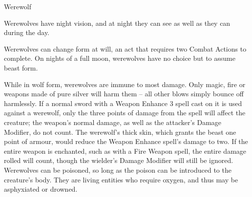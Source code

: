 \begin{monsterbox}{Werewolf}
\begin{rpg-monsteraction}[Magic]
	\end{rpg-monsteraction}
	\begin{rpg-monsteraction}
		Werewolves have night vision, and at night they can see as well as they can during the day.
	\end{rpg-monsteraction}
	\begin{rpg-monsteraction}[Shapeshift]
		Werewolves can change form at will, an act that requires two Combat Actions to complete. On nights of a full moon, werewolves have no choice but to assume beast form.
	\end{rpg-monsteraction}
	\begin{rpg-monsteraction}
		While in wolf form, werewolves are immune to most damage. Only magic, fire or weapons made of pure silver will harm them – all other blows simply bounce off harmlessly. If a normal sword with a Weapon Enhance 3 spell cast on it is used against a werewolf, only the three points of damage from the spell will affect the creature; the weapon’s normal damage, as well as the attacker’s Damage Modifier, do not count. The werewolf’s thick skin, which grants the beast one point of armour, would reduce the Weapon Enhance spell’s damage to two. If the entire weapon is enchanted, such as with a Fire Weapon spell, the entire damage rolled will count, though the wielder’s Damage Modifier will still be ignored. Werewolves can be poisoned, so long as the poison can be introduced to the creature’s body. They are living entities who require oxygen, and thus may be asphyxiated or drowned.
	\end{rpg-monsteraction}

\end{monsterbox}




